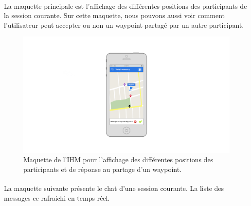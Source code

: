 \documentclass[titlepage, 12pt]{report}
\begin{document}
\clearpage

\paragraph{}La maquette principale est l'affichage des différentes positions des participants de la session courante. Sur cette maquette, nous pouvons aussi voir comment l'utilisateur peut accepter ou non un waypoint partagé par un autre participant.

\begin{figure}[!h]
\caption{Maquette de l'IHM pour l'affichage des différentes positions des participants et de réponse au partage d'un waypoint.}
\label{session_view}
\centering
\includegraphics[scale=0.3]{images/mockups/session_marker.png}
\end{figure}

\clearpage

\paragraph{}La maquette suivante présente le chat d'une session courante. La liste des messages ce rafraichi en temps réel.
\end{document}
